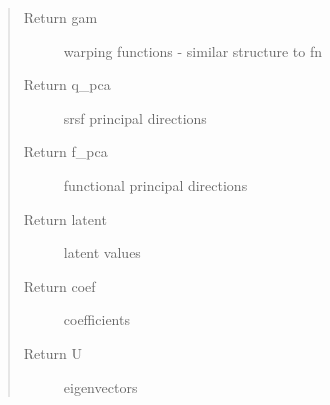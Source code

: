 \documentclass[letterpaper,10pt,english]{sphinxmanual}
\begin{document}
\begin{fulllineitems}
\begin{quote}
\begin{description}
\item[{Return gam}] \leavevmode
warping functions - similar structure to fn

\item[{Return q\_pca}] \leavevmode
srsf principal directions

\item[{Return f\_pca}] \leavevmode
functional principal directions

\item[{Return latent}] \leavevmode
latent values

\item[{Return coef}] \leavevmode
coefficients

\item[{Return U}] \leavevmode
eigenvectors

\end{description}\end{quote}

\end{fulllineitems}

\end{document}
